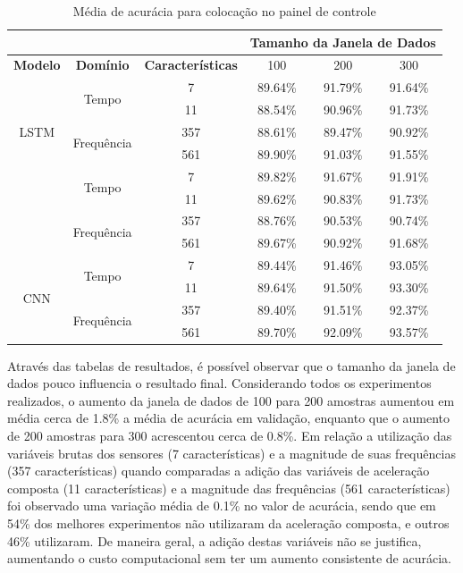 \begin{table}[h!]
\scriptsize
\centering
\caption{Média de acurácia para colocação no painel de controle}
\label{table:dashboard_results_tipo_superficie_2}
\begin{tabular}{cccccc}
\cmidrule(l){4-6}
 & \multicolumn{1}{l}{\textbf{}} & \multicolumn{1}{l}{} & \multicolumn{3}{c}{\textbf{Tamanho da Janela de Dados}} \\ \midrule
\textbf{Modelo} & \textbf{Domínio} & \textbf{Características} & 100 & 200 & \multicolumn{1}{c}{300} \\ \midrule
\multirow{5}{*}{LSTM} & \multirow{2}{*}{Tempo} & 7 & 89.64\% & \cellcolor[HTML]{34FF34}91.79\% & 91.64\% \\ \cmidrule(l){3-6} 
 &  & 11 & 88.54\% & 90.96\% & 91.73\% \\ \cmidrule(l){2-6} 
 & \multirow{2}{*}{Frequência} & 357 & 88.61\% & 89.47\% & 90.92\% \\ \cmidrule(l){3-6} 
 &  & 561 & 89.90\% & 91.03\% & 91.55\% \\ \midrule
\multirow{5}{*}{GRU} & \multirow{2}{*}{Tempo} & 7 & 89.82\% & 91.67\% & \cellcolor[HTML]{34FF34}91.91\% \\ \cmidrule(l){3-6} 
 &  & 11 & 89.62\% & 90.83\% & 91.73\% \\ \cmidrule(l){2-6} 
 & \multirow{2}{*}{Frequência} & 357 & 88.76\% & 90.53\% & 90.74\% \\ \cmidrule(l){3-6} 
 &  & 561 & 89.67\% & 90.92\% & 91.68\% \\ \midrule
\multirow{5}{*}{CNN} & \multirow{2}{*}{Tempo} & 7 & 89.44\% & 91.46\% & 93.05\% \\ \cmidrule(l){3-6} 
 &  & 11 & 89.64\% & 91.50\% & 93.30\% \\ \cmidrule(l){2-6} 
 & \multirow{2}{*}{Frequência} & 357 & 89.40\% & 91.51\% & 92.37\% \\ \cmidrule(l){3-6} 
 &  & 561 & 89.70\% & 92.09\% & \cellcolor[HTML]{34FF34}93.57\% \\ \bottomrule
\end{tabular}
\end{table}

Através das tabelas de resultados, é possível observar que o tamanho da janela de dados pouco influencia o resultado final. Considerando todos os experimentos realizados, o aumento da janela de dados de 100 para 200 amostras aumentou em média cerca de 1.8\% a média de acurácia em validação, enquanto que o aumento de 200 amostras para 300 acrescentou cerca de 0.8\%. Em relação a utilização das variáveis brutas dos sensores (7 características) e a magnitude de suas frequências (357 características) quando comparadas a adição das variáveis de aceleração composta (11 características) e a magnitude das frequências (561 características) foi observado uma variação média de 0.1\% no valor de acurácia, sendo que em 54\% dos melhores experimentos não utilizaram da aceleração composta, e outros 46\% utilizaram. De maneira geral, a adição destas variáveis não se justifica, aumentando o custo computacional sem ter um aumento consistente de acurácia.

